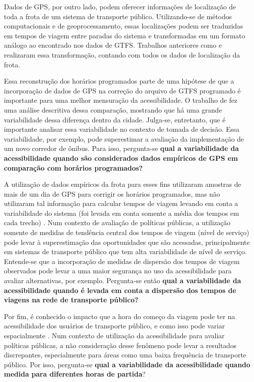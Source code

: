 \documentclass[        
    a4paper,          %
    12pt,             %
    chapter=TITLE,    %
    section=Title,    %
    subsection=Title, %
    oneside,          %
    english,          %
    spanish,          %
    brazil,           %
    fleqn             %
]{abntex2}
\begin{document}
  Dados de GPS, por outro lado, podem oferecer informações de localização de toda a frota de um sistema de transporte público. Utilizando-se de métodos computacionais e de geoprocessamento, essas localizações podem ser traduzidas em tempos de viagem entre paradas do sistema e transformadas em um formato análogo ao encontrado nos dados de GTFS. Trabalhos anteriores como \citet{Wessel2017} e \citet{Arbex2016a} realizaram essa transformação, contando com todos os dados de localização da frota.
  
  Essa reconstrução dos horários programados parte de uma hipótese de que a incorporação de dados de GPS na correção do arquivo de GTFS programado é importante para uma melhor mensuração da acessibilidade. O trabalho de \citet{Wessel2017} fez uma análise descritiva dessa comparação, mostrando que há uma grande variabilidade dessa diferença dentro da cidade. Julga-se, entretanto, que é importante analisar essa variabilidade no contexto de tomada de decisão. Essa variabilidade, por exemplo, pode superestimar a avaliação da implementação de um novo corredor de ônibus. Para isso, pergunta-se \textbf{qual a variabilidade da acessibilidade quando são considerados dados empíricos de GPS em comparação com horários programados?}
  
  A utilização de dados empíricos da frota para esses fins utilizaram amostras de mais de um dia de GPS para corrigir os horários programados, mas não utilizaram tal informação para calcular tempos de viagem levando em conta a variabilidade do sistema (foi levada em conta somente a média dos tempos em cada trecho) \citep{Wessel2017, Arbex2016a}. Num contexto de avaliação de políticas públicas, a utilização somente de medidas de tendência central dos tempos de viagem (nível de serviço) pode levar à superestimação das oportunidades que são acessadas, principalmente em sistemas de transporte público que tem alta variabilidade de nível de serviço. Entende-se que a incorporação de medidas de dispersão dos tempos de viagem observados pode levar a uma maior segurança no uso da acessibilidade para avaliar alternativas, por exemplo. Pergunta-se então \textbf{qual a variabilidade da acessibilidade quando é levada em conta a dispersão dos tempos de viagens na rede de transporte público?}
  
  Por fim, é conhecido o impacto que a hora do começo da viagem pode ter na acessibilidade dos usuários de transporte público, e como isso pode variar espacialmente \citep{Owen2015}. Num contexto de utilização da acessibilidade para avaliar políticas públicas, a não consideração desse fenômeno pode levar a resultados discrepantes, especialmente para áreas como uma baixa frequência de transporte público. Por isso, pergunta-se \textbf{qual a variabilidade da acessibilidade quando medida para diferentes horas de partida}?
  
\end{document}

